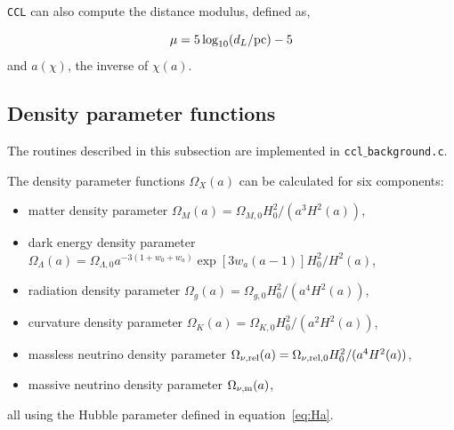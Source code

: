 \documentclass[\docopts]{\docclass}
\newcommand{\ccl}{{\tt CCL}\xspace}
\begin{document}
\ccl can also compute the distance modulus, defined as,

\begin{equation}\label{eq:distmod}
    \mu = 5 \log_{10}(d_L / {\rm pc})-5
\end{equation}
and $a(\chi)$, the inverse of $\chi(a)$.


\subsection{Density parameter functions}
\label{subsec:densityparam}

The routines described in this subsection are implemented in {\tt ccl$\_$background.c}.

The density parameter functions $\Omega_X(a)$ can be calculated for six components:
\begin{itemize}
\item matter density parameter $\Omega_M(a) = \Omega_{M,0} H_0^2 / (a^3 H^2(a) )$,
\item dark energy density parameter $\Omega_\Lambda(a) = \Omega_{\Lambda,0} a^{-3(1+w_0+w_a)} \exp[3 w_a (a-1)] H_0^2 / H^2(a)$,
\item radiation density parameter $\Omega_g(a) = \Omega_{g,0} H_0^2 / (a^4 H^2(a) )$,
\item curvature density parameter $\Omega_K(a) = \Omega_{K,0} H_0^2 / (a^2 H^2(a) )$,
\item massless neutrino density parameter $\Omega_{\nu, {\rm rel}}(a) = \Omega_{\nu, {\rm rel},0} H_0^2 / (a^4 H^2(a) )$,
\item massive neutrino density parameter $\Omega_{\nu, {\rm m}}(a)$,
\end{itemize}
all using the Hubble parameter defined in equation~\ref{eq:Ha}.
\end{document}
